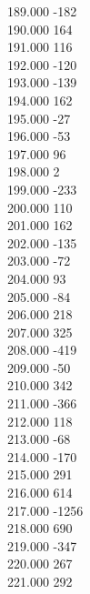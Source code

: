 { 189.000	-182 \\
 190.000	164 \\
 191.000	116 \\
 192.000	-120 \\
 193.000	-139 \\
 194.000	162 \\
 195.000	-27 \\
 196.000	-53 \\
 197.000	96 \\
 198.000	2 \\
 199.000	-233 \\
 200.000	110 \\
 201.000	162 \\
 202.000	-135 \\
 203.000	-72 \\
 204.000	93 \\
 205.000	-84 \\
 206.000	218 \\
 207.000	325 \\
 208.000	-419 \\
 209.000	-50 \\
 210.000	342 \\
 211.000	-366 \\
 212.000	118 \\
 213.000	-68 \\
 214.000	-170 \\
 215.000	291 \\
 216.000	614 \\
 217.000	-1256 \\
 218.000	690 \\
 219.000	-347 \\
 220.000	267 \\
 221.000	292 \\
}
